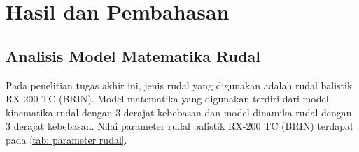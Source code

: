 \pagebreak
\chapter{Hasil dan Pembahasan}

\section{Analisis Model Matematika Rudal}
Pada penelitian tugas akhir ini, jenis rudal yang digunakan adalah rudal balistik RX-200 TC (BRIN). Model matematika yang digunakan terdiri dari model kinematika rudal dengan 3 derajat kebebasan dan model dinamika rudal dengan 3 derajat kebebasan. Nilai parameter rudal balistik RX-200 TC (BRIN) terdapat pada \ref{tab: parameter rudal}.


